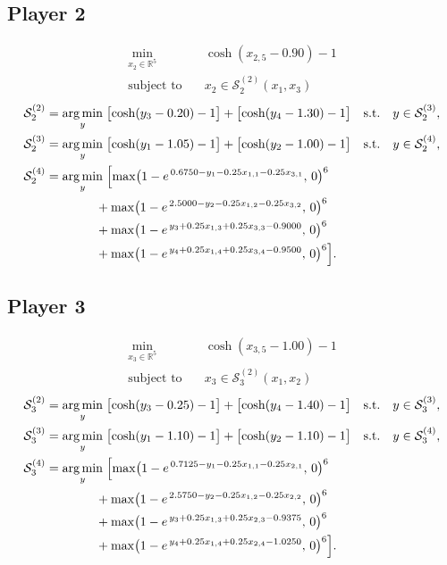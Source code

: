 \documentclass[11pt]{article}
\newcommand{\argmin}{\operatorname*{arg\,min}}
\begin{document}
\subsection*{Player 2}
\[
\begin{aligned}
  \min_{x_2 \in \mathbb{R}^5} \quad & \cosh(x_{2,5}-0.90)-1 \\
  \text{subject to} \quad & x_2 \in \mathcal{S}_2^{(2)}(x_1,x_3)
\end{aligned}
\]
\[
\begin{aligned}
  \mathcal{S}_2^{(2)} &= \argmin_{y} \;
    \bigl[\cosh(y_3-0.20)-1\bigr] + \bigl[\cosh(y_4-1.30)-1\bigr]
    \quad \text{s.t.} \quad y \in \mathcal{S}_2^{(3)}, \\
  \mathcal{S}_2^{(3)} &= \argmin_{y} \;
    \bigl[\cosh(y_1-1.05)-1\bigr] + \bigl[\cosh(y_2-1.00)-1\bigr]
    \quad \text{s.t.} \quad y \in \mathcal{S}_2^{(4)}, \\
  \mathcal{S}_2^{(4)} &= \argmin_{y} \;
    \Bigl[ \max\bigl(1 - e^{\,0.6750 - y_1 - 0.25x_{1,1} - 0.25x_{3,1}},\,0\bigr)^6 \\
    &\qquad\qquad + \max\bigl(1 - e^{\,2.5000 - y_2 - 0.25x_{1,2} - 0.25x_{3,2}},\,0\bigr)^6 \\
    &\qquad\qquad + \max\bigl(1 - e^{\,y_3 + 0.25x_{1,3} + 0.25x_{3,3} - 0.9000},\,0\bigr)^6 \\
    &\qquad\qquad + \max\bigl(1 - e^{\,y_4 + 0.25x_{1,4} + 0.25x_{3,4} - 0.9500},\,0\bigr)^6 \Bigr].
\end{aligned}
\]

\subsection*{Player 3}
\[
\begin{aligned}
  \min_{x_3 \in \mathbb{R}^5} \quad & \cosh(x_{3,5}-1.00)-1 \\
  \text{subject to} \quad & x_3 \in \mathcal{S}_3^{(2)}(x_1,x_2)
\end{aligned}
\]
\[
\begin{aligned}
  \mathcal{S}_3^{(2)} &= \argmin_{y} \;
    \bigl[\cosh(y_3-0.25)-1\bigr] + \bigl[\cosh(y_4-1.40)-1\bigr]
    \quad \text{s.t.} \quad y \in \mathcal{S}_3^{(3)}, \\
  \mathcal{S}_3^{(3)} &= \argmin_{y} \;
    \bigl[\cosh(y_1-1.10)-1\bigr] + \bigl[\cosh(y_2-1.10)-1\bigr]
    \quad \text{s.t.} \quad y \in \mathcal{S}_3^{(4)}, \\
  \mathcal{S}_3^{(4)} &= \argmin_{y} \;
    \Bigl[ \max\bigl(1 - e^{\,0.7125 - y_1 - 0.25x_{1,1} - 0.25x_{2,1}},\,0\bigr)^6 \\
    &\qquad\qquad + \max\bigl(1 - e^{\,2.5750 - y_2 - 0.25x_{1,2} - 0.25x_{2,2}},\,0\bigr)^6 \\
    &\qquad\qquad + \max\bigl(1 - e^{\,y_3 + 0.25x_{1,3} + 0.25x_{2,3} - 0.9375},\,0\bigr)^6 \\
    &\qquad\qquad + \max\bigl(1 - e^{\,y_4 + 0.25x_{1,4} + 0.25x_{2,4} - 1.0250},\,0\bigr)^6 \Bigr].
\end{aligned}
\]
\end{document}
